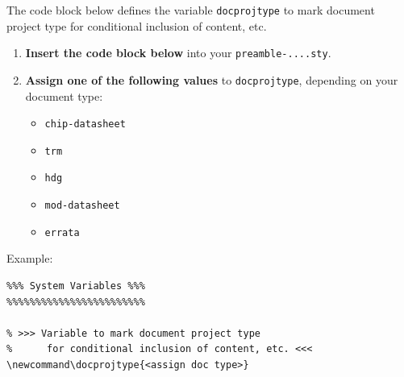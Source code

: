 \else
    \begin{tiplisting}
      The code block below defines the variable \texttt{docprojtype} to mark document project type for conditional inclusion of content, etc.
      \begin{enumerate}
        \item \textbf{Insert the code block below} into your \texttt{preamble-....sty}.
        \item \textbf{Assign one of the following values} to \texttt{docprojtype}, depending on your document type:
	    \begin{itemize}
	        \item \texttt{chip-datasheet}
	        \item \texttt{trm}
	        \item \texttt{hdg}
	        \item \texttt{mod-datasheet}
	        \item \texttt{errata}
	    \end{itemize}
      \end{enumerate}

	    Example:
	    
\begin{lstlisting}[numbers=none]
%%%%%%%%%%%%%%%%%%%%%%%%
%%% System Variables %%%
%%%%%%%%%%%%%%%%%%%%%%%%

% >>> Variable to mark document project type
%      for conditional inclusion of content, etc. <<<
\newcommand\docprojtype{<assign doc type>}
\end{lstlisting}

    \end{tiplisting}

    \stop

\fi%
